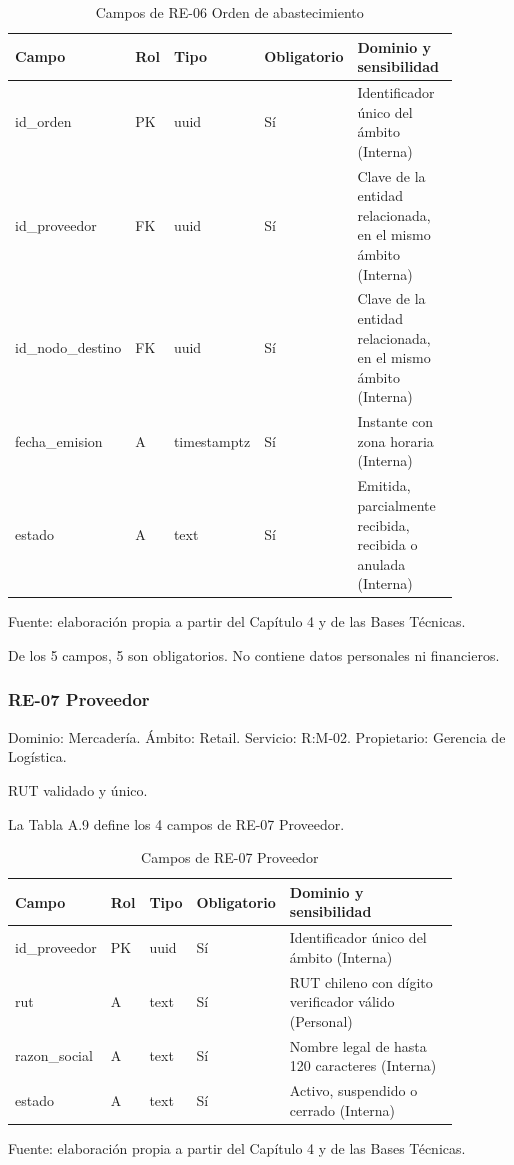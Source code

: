 \documentclass[11pt]{article}
\begin{document}
\begin{table}[htbp]
\caption{Campos de RE-06 Orden de abastecimiento}\label{tab:d_re06}
\centering
\begin{tabular}{@{}p{0.167\linewidth}p{0.070\linewidth}p{0.079\linewidth}p{0.097\linewidth}p{0.465\linewidth}@{}}
\toprule Campo & Rol & Tipo & Obligatorio & Dominio y sensibilidad \\
\midrule
id\_orden & PK & uuid & Sí & Identificador único del ámbito (Interna) \\
id\_proveedor & FK & uuid & Sí & Clave de la entidad relacionada, en el mismo ámbito (Interna) \\
id\_nodo\_destino & FK & uuid & Sí & Clave de la entidad relacionada, en el mismo ámbito (Interna) \\
fecha\_emision & A & timestamptz & Sí & Instante con zona horaria (Interna) \\
estado & A & text & Sí & Emitida, parcialmente recibida, recibida o anulada (Interna) \\
\bottomrule
\end{tabular}
\par\smallskip
{\raggedright Fuente: elaboración propia a partir del Capítulo 4 y de las Bases Técnicas.\par}
\end{table}


De los 5 campos, 5 son obligatorios. No contiene datos personales ni financieros.

\subsubsection{RE-07 Proveedor}

Dominio: Mercadería. Ámbito: Retail. Servicio: R:M-02. Propietario: Gerencia de Logística.

RUT validado y único.

La Tabla A.9 define los 4 campos de RE-07 Proveedor.

\begin{table}[htbp]
\caption{Campos de RE-07 Proveedor}\label{tab:d_re07}
\centering
\begin{tabular}{@{}p{0.167\linewidth}p{0.070\linewidth}p{0.079\linewidth}p{0.097\linewidth}p{0.465\linewidth}@{}}
\toprule Campo & Rol & Tipo & Obligatorio & Dominio y sensibilidad \\
\midrule
id\_proveedor & PK & uuid & Sí & Identificador único del ámbito (Interna) \\
rut & A & text & Sí & RUT chileno con dígito verificador válido (Personal) \\
razon\_social & A & text & Sí & Nombre legal de hasta 120 caracteres (Interna) \\
estado & A & text & Sí & Activo, suspendido o cerrado (Interna) \\
\bottomrule
\end{tabular}
\par\smallskip
{\raggedright Fuente: elaboración propia a partir del Capítulo 4 y de las Bases Técnicas.\par}
\end{table}
\end{document}
